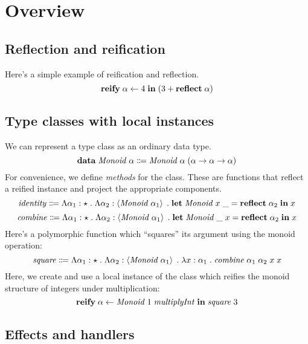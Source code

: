 \section{Overview}

  \subsection{Reflection and reification}

    Here's a simple example of reification and reflection.
    \[ \mathbf{reify} \; \alpha \leftarrow 4 \; \mathbf{in} \; \mathopen{}\left( 3 + \mathbf{reflect} \; \alpha \right)\mathclose{} \]

  \subsection{Type classes with local instances}

    We can represent a type class as an ordinary data type.
    \[ \mathbf{data} \; \mathit{Monoid} \; \alpha \Coloneqq \mathit{Monoid} \; \alpha \; \mathopen{}\left( \alpha \rightarrow \alpha \rightarrow \alpha \right)\mathclose{} \]
    For convenience, we define \emph{methods} for the class. These are functions that reflect a reified instance and project the appropriate components.
    \[ \mathit{identity} \Coloneqq \Lambda \alpha_1 : \star \; . \; \Lambda \alpha_2 : \left\langle \mathit{Monoid} \; \alpha_1 \right\rangle \; . \; \mathbf{let} \; \mathit{Monoid} \; x \; \_ = \mathbf{reflect} \; \alpha_2 \; \mathbf{in} \; x \]
    \[ \mathit{combine} \Coloneqq \Lambda \alpha_1 : \star \; . \; \Lambda \alpha_2 : \left\langle \mathit{Monoid} \; \alpha_1 \right\rangle \; . \; \mathbf{let} \; \mathit{Monoid} \; \_ \; x = \mathbf{reflect} \; \alpha_2 \; \mathbf{in} \; x \]
    Here's a polymorphic function which ``squares'' its argument using the monoid operation:
    \[ \mathit{square} \Coloneqq \Lambda \alpha_1 : \star \; . \; \Lambda \alpha_2 : \left\langle \mathit{Monoid} \; \alpha_1 \right\rangle \; . \; \lambda x : \alpha_1 \; . \; \mathit{combine} \; \alpha_1 \; \alpha_2 \; x \; x \]
    Here, we create and use a local instance of the class which reifies the monoid structure of integers under multiplication:
    \[ \mathbf{reify} \; \alpha \leftarrow \mathit{Monoid} \; 1 \; \mathit{multiplyInt} \; \mathbf{in} \; \mathit{square} \; 3 \]

  \subsection{Effects and handlers}
